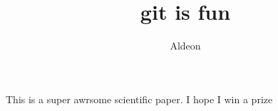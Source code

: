 \documentclass[10pt]{article}
\author{Aldeon}
\title{git is fun}
\begin{document}
		\maketitle
		
		This is a super awrsome scientific paper.
		I hope I win a prize
		
\end{document}
